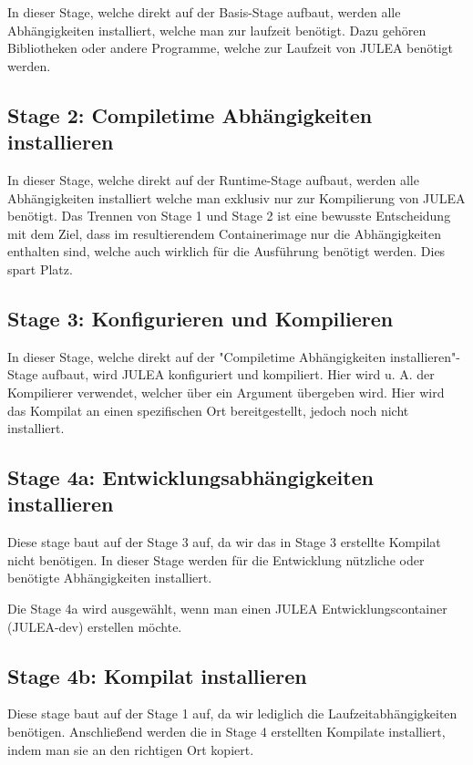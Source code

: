 In dieser Stage, welche direkt auf der Basis-Stage aufbaut, werden alle Abhängigkeiten installiert, welche man zur laufzeit benötigt. Dazu gehören Bibliotheken oder andere Programme, welche zur Laufzeit von JULEA benötigt werden.


\subsection{Stage 2: Compiletime Abhängigkeiten installieren}

In dieser Stage, welche direkt auf der Runtime-Stage aufbaut, werden alle Abhängigkeiten installiert welche man exklusiv nur zur Kompilierung von JULEA benötigt. Das Trennen von Stage 1 und Stage 2 ist eine bewusste Entscheidung mit dem Ziel, dass im resultierendem Containerimage nur die Abhängigkeiten enthalten sind, welche auch wirklich für die Ausführung benötigt werden. Dies spart Platz.

\subsection{Stage 3: Konfigurieren und Kompilieren}

In dieser Stage, welche direkt auf der "Compiletime Abhängigkeiten installieren"-Stage aufbaut, wird JULEA konfiguriert und kompiliert. Hier wird u. A. der Kompilierer verwendet, welcher über ein Argument übergeben wird. Hier wird das Kompilat an einen spezifischen Ort bereitgestellt, jedoch noch nicht installiert.

\subsection{Stage 4a: Entwicklungsabhängigkeiten installieren}

Diese stage baut auf der Stage 3 auf, da wir das in Stage 3 erstellte Kompilat nicht benötigen. 
In dieser Stage werden für die Entwicklung nützliche oder benötigte Abhängigkeiten installiert. 

Die Stage 4a wird ausgewählt, wenn man einen JULEA Entwicklungscontainer (JULEA-dev) erstellen möchte. 

\subsection{Stage 4b: Kompilat installieren}

Diese stage baut auf der Stage 1 auf, da wir lediglich die Laufzeitabhängigkeiten benötigen. Anschließend werden die in Stage 4 erstellten Kompilate installiert, indem man sie an den richtigen Ort kopiert.

